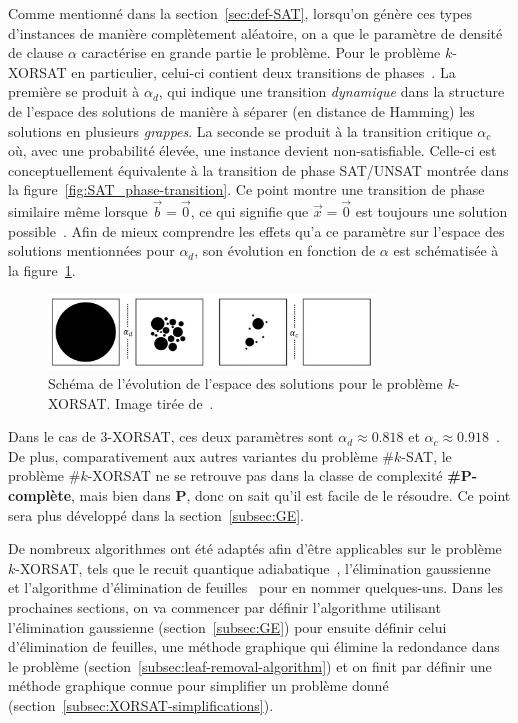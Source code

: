 Comme mentionné dans la section~\ref{sec:def-SAT}, lorsqu'on génère ces types d'instances de manière complètement aléatoire, on a que le paramètre de densité de clause $\alpha$ caractérise en grande partie le problème.
Pour le problème $k$-XORSAT en particulier, celui-ci contient deux transitions de phases~\cite{mezard_alternative_2002}.
La première se produit à $\alpha_d$, qui indique une transition \emph{dynamique} dans la structure de l'espace des solutions de manière à séparer (en distance de Hamming) les solutions en plusieurs \emph{grappes}.
La seconde se produit à la transition critique $\alpha_c$ où, avec une probabilité élevée, une instance devient non-satisfiable.
Celle-ci est conceptuellement équivalente à la transition de phase SAT/UNSAT montrée dans la figure~\ref{fig:SAT_phase-transition}.
Ce point montre une transition de phase similaire même lorsque $\vec{b} = \vec{0}$, ce qui signifie que $\vec{x} = \vec{0}$ est toujours une solution possible~\cite{ricci2001simplest}.
Afin de mieux comprendre les effets qu'a ce paramètre sur l'espace des solutions mentionnées pour $\alpha_d$, son évolution en fonction de $\alpha$ est schématisée à la figure~\ref{fig:solution-space}.
\begin{figure}[h]
    \centering
    \includegraphics[width=0.77\textwidth]{Figures/solution_space_evolution.jpeg}
    \caption[L'évolution de l'espace des solutions pour le problème \mbox{$k$-XORSAT}.]{Schéma de l'évolution de l'espace des solutions pour le problème \mbox{$k$-XORSAT}. Image tirée de~\protect\cite{moore_nature_2011}.}
    \label{fig:solution-space}
\end{figure}
Dans le cas de $3$-XORSAT, ces deux paramètres sont $\alpha_d \approx 0.818$ et $\alpha_c \approx 0.918$~\cite{mezard_alternative_2002}.
De plus, comparativement aux autres variantes du problème \#$k$-SAT, le problème \#$k$-XORSAT ne se retrouve pas dans la classe de complexité \textbf{\#P-complète}, mais bien dans \textbf{P}, donc on sait qu'il est facile de le résoudre.
Ce point sera plus développé dans la section~\ref{subsec:GE}.

De nombreux algorithmes ont été adaptés afin d'être applicables sur le problème $k$-XORSAT, tels que le recuit quantique adiabatique~\cite{patil_obstacles_2019}, l'élimination gaussienne~\cite{braunstein_complexity_2002} et l'algorithme d'élimination de feuilles~\cite{mezard_alternative_2002} pour en nommer quelques-uns.
Dans les prochaines sections, on va commencer par définir l'algorithme utilisant l'élimination gaussienne (section~\ref{subsec:GE}) pour ensuite définir celui d'élimination de feuilles, une méthode graphique qui élimine la redondance dans le problème (section~\ref{subsec:leaf-removal-algorithm}) et on finit par définir une méthode graphique connue pour simplifier un problème donné (section~\ref{subsec:XORSAT-simplifications}).

